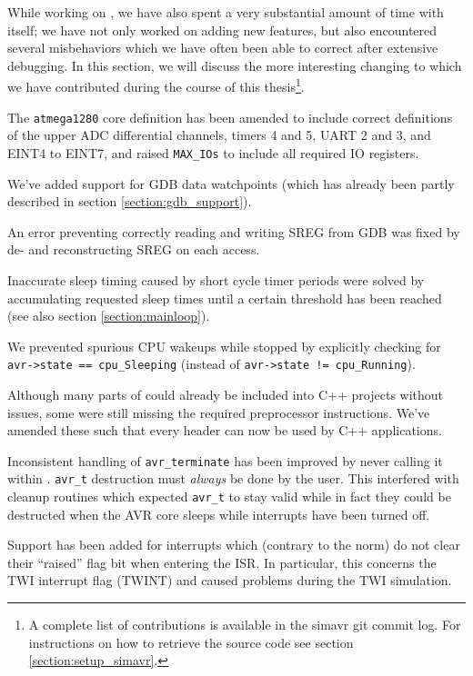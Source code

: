 While working on \qsimavr, we have also spent a very substantial amount of time
with \simavr itself; we have not only worked on adding new features, but also encountered
several misbehaviors which we have often been able to correct after extensive debugging.
In this section, we will discuss the more interesting changing to \simavr which
we have contributed during the course of this thesis\footnote{
%
A complete list of contributions is available in the simavr git commit log. For
instructions on how to retrieve the source code see section \ref{section:setup_simavr}.
%
}.

The \verb|atmega1280| core definition has been amended to include correct
definitions of the upper \ac{ADC}
differential channels, timers 4 and 5, \ac{UART} 2 and 3, and EINT4 to EINT7, and raised
\lstinline|MAX_IOs| to include all required \ac{IO} registers.

We've added support for \ac{GDB} data watchpoints (which has already been
partly described in section \ref{section:gdb_support}).

An error preventing correctly reading and writing \ac{SREG} from \ac{GDB} was fixed
by de- and reconstructing \ac{SREG} on each access.

Inaccurate sleep timing caused by short cycle timer periods were solved by
accumulating requested sleep times until a certain threshold has been reached
(see also section \ref{section:mainloop}).

We prevented spurious \ac{CPU} wakeups while stopped by explicitly checking for
\lstinline|avr->state == cpu_Sleeping|
(instead of \lstinline|avr->state != cpu_Running|).

Although many parts of \simavr could already be included into C++ projects
without issues, some were still missing the required preprocessor instructions.
We've amended these such that every header can now be used by C++ applications.

Inconsistent handling of \lstinline|avr_terminate| has been improved by never
calling it within \simavr. \lstinline|avr_t| destruction must \emph{always}
be done by the user. This interfered with cleanup routines which expected
\lstinline|avr_t| to stay valid while in fact they could be destructed when
the \ac{AVR} core sleeps while interrupts have been turned off.

Support has been added for interrupts which (contrary to the norm) do not clear
their ``raised'' flag bit when entering the \ac{ISR}. In particular, this
concerns the \ac{TWI} interrupt flag (TWINT) and caused problems during the
\ac{TWI} simulation.

